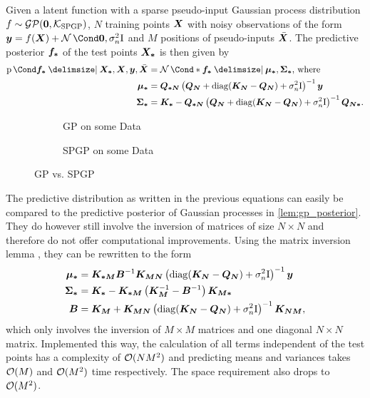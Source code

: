 \begin{lemma}
    \label{lem:spgp_posterior}
    Given a latent function with a sparse pseudo-input Gaussian process distribution $f \sim \operatorname{\mathcal{GP}}(\bm{0}, \operatorname{\mathcal{K}}_{\text{SPGP}})$, $N$ training points $\bm{X}$ with noisy observations of the form $\mat{y} = f(\mat{X}) + \Gaussian{\mat{0}, \sigma_n^2 \Eye}$ and $M$ positions of pseudo-inputs $\bar{\bm{X}}$.
    The predictive posterior $\bm{f_\ast}$ of the test points $\bm{X_\ast}$ is then given by
    \begin{align}
        \Prob{\mat{f_\ast} \given \mat{X_\ast}, \mat{X}, \mat{y}, \ps{\mat{X}}} &= \Gaussian*{\mat{f_\ast} \given \mat{\mu_\ast}, \mat{\Sigma_\ast}} \text{, where} \\
        \mat{\mu_\ast} &= \mat{Q_{\ast N}} \left( \mat{Q_N} + \diag(\mat{K_N} - \mat{Q_N}) + \sigma_n^2 \Eye \right)^{-1} \mat{y} \\
        \mat{\Sigma_\ast} &= \mat{K_\ast} - \mat{Q_{\ast N}} \left( \mat{Q_N} + \diag(\mat{K_N} - \mat{Q_N}) + \sigma_n^2 \Eye \right)^{-1} \mat{Q_{N \ast}}.
    \end{align}
\end{lemma}
\begin{figure}[t]
    \centering
    \begin{subfigure}{\subfigurewidth}
        \caption{GP on some Data}
        \label{fig:spgp_example:gp}
    \end{subfigure}
    \begin{subfigure}{\subfigurewidth}
        \caption{SPGP on some Data}
        \label{fig:spgp_example:spgp}
    \end{subfigure}
    \caption{GP vs. SPGP}
    \label{fig:spgp_example}
\end{figure}

The predictive distribution as written in the previous equations can easily be compared to the predictive posterior of Gaussian processes in \cref{lem:gp_posterior}.
They do however still involve the inversion of matrices of size $N \times N$ and therefore do not offer computational improvements.
Using the matrix inversion lemma \cite{petersen_matrix_2008}, they can be rewritten to the form
\begin{align}
    \bm{\mu_\ast} &= \bm{K_{\ast M}} \bm{B}^{-1} \bm{K_{MN}} \left( \operatorname{diag}(\bm{K_N} - \bm{Q_N}) + \sigma_n^2 \mathrm{I} \right)^{-1} \bm{y} \\
    \bm{\Sigma_\ast} &= \bm{K_\ast} - \bm{K_{\ast M}} \left( \bm{K_M}^{-1} - \bm{B}^{-1} \right) \bm{K_{M \ast}} \\
    \bm{B} &= \bm{K_M} + \bm{K_{MN}} \left( \operatorname{diag}(\bm{K_N} - \bm{Q_N}) + \sigma_n^2 \mathrm{I} \right)^{-1} \bm{K_{NM}},
\end{align}
which only involves the inversion of $M \times M$ matrices and one diagonal $N \times N$ matrix.
Implemented this way, the calculation of all terms independent of the test points has a complexity of $\operatorname{\mathcal{O}}(NM^2)$ and predicting means and variances takes $\operatorname{\mathcal{O}}(M)$ and $\operatorname{\mathcal{O}}(M^2)$ time respectively.
The space requirement also drops to $\operatorname{\mathcal{O}}(M^2)$.

